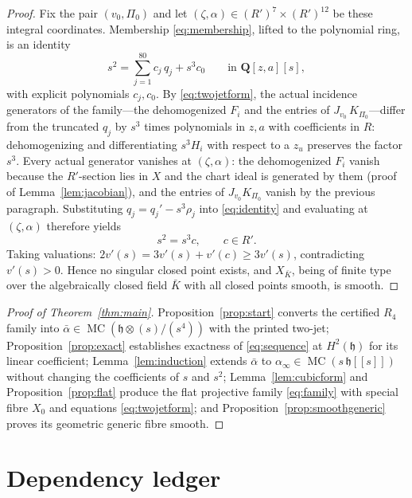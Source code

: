 \documentclass[11pt]{article}
\theoremstyle{definition}
\theoremstyle{remark}
\newcommand{\QQ}{\mathbf Q}
\newcommand{\MC}{\operatorname{MC}}
\newcommand{\h}{\mathfrak h}
\begin{document}
\begin{proof}
Fix the pair $(v_0,\Pi_0)$ and let
$(\zeta,\alpha)\in(R')^7\times(R')^{12}$ be these integral coordinates.
Membership \eqref{eq:membership}, lifted to the polynomial ring, is an
identity
\[
 s^2=\sum_{j=1}^{80}c_j\,q_j+s^3c_0
 \qquad\text{in }\QQ[z,a][s],
\tag{8.3}\label{eq:identity}
\]
with explicit polynomials $c_j,c_0$.  By \eqref{eq:twojetform}, the actual
incidence generators of the family---the dehomogenized $F_i$ and the
entries of $J_{v_0}\,K_{\Pi_0}$---differ from the truncated $q_j$ by $s^3$
times polynomials in $z,a$ with coefficients in $R$: dehomogenizing and
differentiating $s^3H_i$ with respect to a $z_u$ preserves the factor
$s^3$.  Every actual generator vanishes at $(\zeta,\alpha)$: the
dehomogenized $F_i$ vanish because the $R'$-section lies in $X$ and the
chart ideal is generated by them (proof of Lemma~\ref{lem:jacobian}), and
the entries of $J_{v_0}K_{\Pi_0}$ vanish by the previous paragraph.
Substituting $q_j=q_j'-s^3\rho_j$ into \eqref{eq:identity} and evaluating
at $(\zeta,\alpha)$ therefore yields
\[
 s^2=s^3c,\qquad c\in R'.
\]
Taking valuations: $2v'(s)=3v'(s)+v'(c)\geq3v'(s)$, contradicting
$v'(s)>0$.  Hence no singular closed point exists, and $X_{\bar K}$, being
of finite type over the algebraically closed field $\bar K$ with all closed
points smooth, is smooth.
\end{proof}

\begin{proof}[Proof of Theorem~\textup{\ref{thm:main}}]
Proposition~\ref{prop:start} converts the certified $R_4$ family into
$\bar\alpha\in\MC(\h\otimes(s)/(s^4))$ with the printed two-jet;
Proposition~\ref{prop:exact} establishes exactness of \eqref{eq:sequence}
at $H^2(\h)$ for its linear coefficient; Lemma~\ref{lem:induction} extends
$\bar\alpha$ to $\alpha_\infty\in\MC(s\,\h[[s]])$ without changing the
coefficients of $s$ and $s^2$; Lemma~\ref{lem:cubicform} and
Proposition~\ref{prop:flat} produce the flat projective family
\eqref{eq:family} with special fibre $X_0$ and equations
\eqref{eq:twojetform}; and Proposition~\ref{prop:smoothgeneric} proves its
geometric generic fibre smooth.
\end{proof}

\section{Dependency ledger}\label{sec:ledger}
\end{document}
